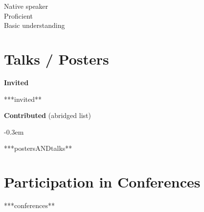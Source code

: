 \documentclass[10pt]{article}
\renewcommand{\labelenumi}{-\label{A\theenumi}}
\begin{document}
\begin{minipage}{\linewidth}
\begin{multicols}{4}
\begin{itemize}
        \skills{~}{}
        \skills{~}{}
        \end{itemize}
      \end{multicols}
      \begin{minipage}{0.5\linewidth}
        \begin{footnotesize}
        \raggedleft
           Native speaker \threeskill \\
          Proficient \twoskill \\
          Basic understanding \oneskill \\
        \end{footnotesize}
      \end{minipage}

  \end{minipage}

\fi


\section{Talks / Posters}

\textbf{Invited}
\begin{enumerate}

  ***invited**

\end{enumerate}

\textbf{Contributed} (abridged list)
\renewcommand{\labelenumi}{[P\arabic{enumi}] }
\begin{enumerate}\itemsep-0.3em

  ***postersANDtalks**

\end{enumerate}


\ifconferences

  \section{Participation in Conferences}
  \begin{itemize}

    ***conferences**

  \end{itemize}

\fi


\ifreferees
\end{document}
